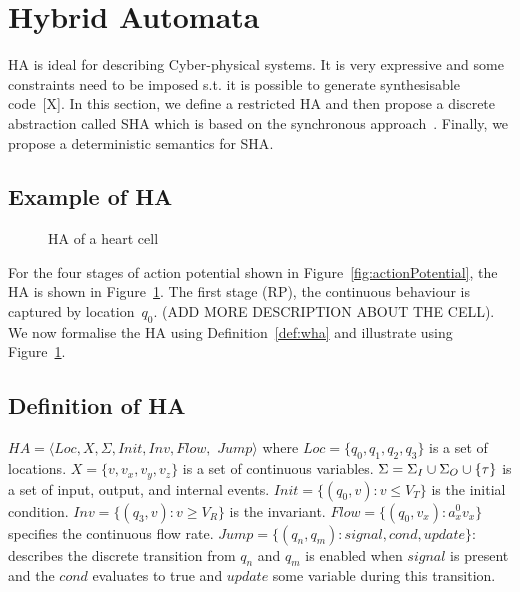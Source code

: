 \section{Hybrid Automata}
\label{sec:HA}



\acf{HA} is ideal for describing 
Cyber-physical systems. It is very expressive and
some constraints need to be imposed s.t. it is possible to  
generate synthesisable  code~[X]. In this section, 
we define a restricted \ac{HA} and then propose a discrete abstraction
called \acf{SHA} which is based on the
synchronous approach~\cite{benveniste03}.
Finally, we propose a deterministic semantics for \ac{SHA}.



\subsection{Example of \acf{HA} }

\begin{figure}
\centering

\caption{\acf{HA} of a heart cell \label{fig:heartCellHA}}
\end{figure}


For the four stages of action potential  shown in Figure~\ref{fig:actionPotential}, the \ac{HA} is
shown in Figure~\ref{fig:heartCellHA}.
The first stage (\ac{RP}), the continuous behaviour is captured 
by location~$q_0$. (ADD MORE DESCRIPTION ABOUT THE CELL).
We now formalise
the \ac{HA} using Definition~\ref{def:wha} and illustrate using Figure~\ref{fig:heartCellHA}.

\subsection{Definition of \acf{HA}}

\begin{definition}
	$HA = \langle Loc, X, \Sigma, Init, Inv, Flow,$ $ Jump \rangle$ where
	$Loc=\{q_0,q_1,q_2,q_3\}$ is a set of locations.
	$X=\{v,v_x,v_y,v_z\}$ is a set of continuous variables.
	$\Sigma=\Sigma_I \cup \Sigma_O \cup \{\tau\}$ is a set of
	 input, output, and internal events.
	$Init=\{(q_0,v): v\leq V_T\}$ is the initial condition.
	$Inv=\{(q_3,v): v\geq V_R\}$ is the invariant.
	$Flow=\{(q_0,v_x): a_{x}^{0} v_x\}$ specifies the continuous flow rate.
	$Jump=\{(q_n, q_m): signal, cond, update\}$: describes the discrete
	transition from $q_n$ and $q_m$ is enabled when $signal$ is 
	present and the $cond$ evaluates to true and $update$
	some variable during this transition.
	
	
	\label{def:ha}
\end{definition}

